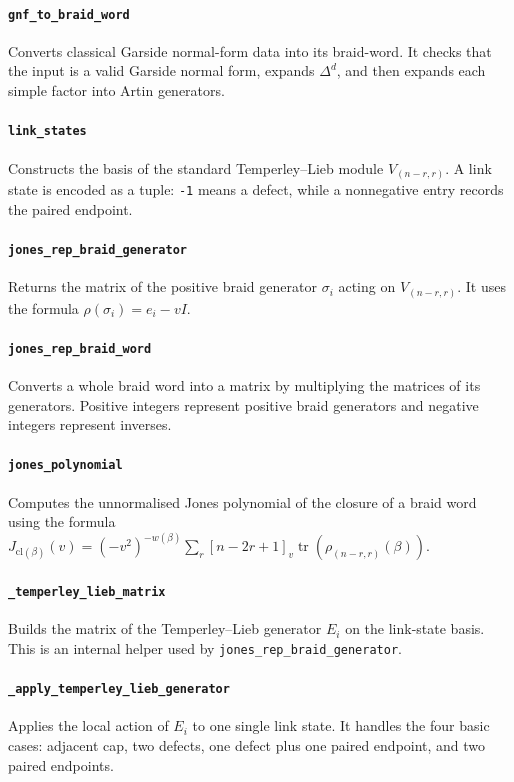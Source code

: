 ﻿\documentclass[10pt]{article}
\begin{document}
\paragraph{\texttt{gnf\_to\_braid\_word}}
Converts classical Garside normal-form data into its braid-word.
It checks that the input is a valid Garside normal form, expands \(\Delta^d\),
and then expands each simple factor into Artin generators.

\paragraph{\texttt{link\_states}}
Constructs the basis of the standard Temperley--Lieb module \(V_{(n-r,r)}\).
A link state is encoded as a tuple: \texttt{-1} means a defect, while a nonnegative entry records the paired endpoint.

\paragraph{\texttt{jones\_rep\_braid\_generator}}
Returns the matrix of the positive braid generator \(\sigma_i\) acting on \(V_{(n-r,r)}\).
It uses the formula $\rho(\sigma_i) = e_i - vI$.

\paragraph{\texttt{jones\_rep\_braid\_word}}
Converts a whole braid word into a matrix by multiplying the matrices of its generators.
Positive integers represent positive braid generators and negative integers represent inverses.

\paragraph{\texttt{jones\_polynomial}}
Computes the unnormalised Jones polynomial of the closure of a braid word using the formula
$J_{\mathrm{cl}(\beta)}(v)
= (-v^2)^{-w(\beta)}
\sum_r [n-2r+1]_v \operatorname{tr}(\rho_{(n-r,r)}(\beta))$.

\paragraph{\texttt{\_temperley\_lieb\_matrix}}
Builds the matrix of the Temperley--Lieb generator \(E_i\) on the link-state basis.
This is an internal helper used by \texttt{jones\_rep\_braid\_generator}.

\paragraph{\texttt{\_apply\_temperley\_lieb\_generator}}
Applies the local action of \(E_i\) to one single link state.
It handles the four basic cases: adjacent cap, two defects, one defect plus one paired endpoint, and two paired endpoints.
\end{document}
